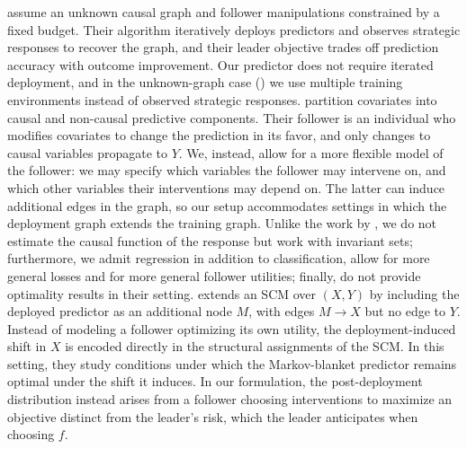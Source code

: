 \citet{yanDiscoveringOptimalScoring2023} assume an unknown causal graph and follower manipulations constrained by a fixed budget. Their algorithm iteratively deploys predictors and observes strategic responses to recover the graph, and their leader objective trades off prediction accuracy with outcome improvement. Our predictor does not require iterated deployment, and in the unknown-graph case () we use multiple training environments instead of observed strategic responses.
\citet{horowitzCausalStrategicClassification2023} partition covariates into causal and non-causal predictive components. Their follower is an individual who modifies covariates to change the prediction in its favor, and only changes to causal variables propagate to $Y$. 
We, instead, allow for a more flexible model of the follower:  we may specify which variables the follower may intervene on, and which other variables their interventions may depend on. The latter can induce additional edges in the graph, so our setup accommodates settings in which the deployment graph extends the training graph. Unlike the work by \citet{horowitzCausalStrategicClassification2023}, we do not estimate the causal function of the response but work with invariant sets; furthermore, we admit regression in addition to classification, allow for more general losses 
and for more general follower utilities; finally, \citet{horowitzCausalStrategicClassification2023} do not provide optimality results in their setting.
\citet{kulynychCausalPredictionCan2022} extends an SCM over $(X,Y)$ by including the deployed predictor as an additional node $M$, with edges $M \to X$ but no edge to $Y$. Instead of modeling a follower optimizing its own utility, the deployment-induced shift in $X$ is encoded directly in the structural assignments of the SCM. In this setting, they study conditions under which the Markov-blanket predictor remains optimal under the shift it induces. In our formulation, the post-deployment distribution instead arises from a follower choosing interventions to maximize an objective distinct from the leader's risk, which the leader anticipates when choosing $f$. 

